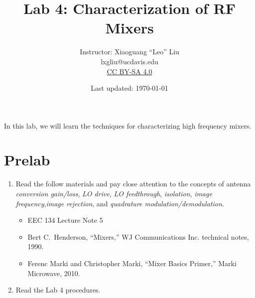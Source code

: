 \documentclass[letterpaper, 11pt]{article}
\begin{document}
\title{Lab 4: Characterization of RF Mixers}
\author{Instructor: Xiaoguang ``Leo'' Liu\\lxgliu@ucdavis.edu \\
	\small \href{http://creativecommons.org/licenses/by-sa/4.0/}{CC BY-SA 4.0}}
\date{Last updated: \today}

\maketitle

In this lab, we will learn the techniques for characterizing high frequency mixers. 

%


\section{Prelab}
\begin{enumerate}
	\item Read the follow materials and pay close attention to the concepts of antenna \textit{conversion gain/loss}, \textit{LO drive}, \textit{LO feedthrough}, \textit{isolation}, \textit{image frequency},\textit{image rejection}, and \textit{quadrature modulation/demodulation}. 
	\begin{itemize}
		\item EEC 134 Lecture Note 5 
		
		\item Bert C.~Henderson, ``Mixers,'' WJ Communications Inc. technical notes, 1990. 
		\item Ferenc Marki and Christopher Marki, ``Mixer Basics Primer,'' Marki Microwave, 2010.
	\end{itemize}
	\item Read the Lab 4 procedures. 

\end{enumerate}
\end{document}
